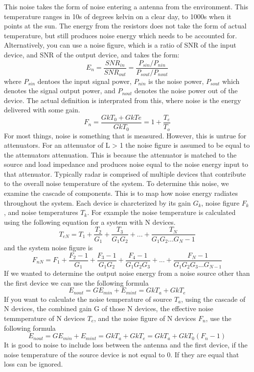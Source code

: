 \documentclass[12pt]{article}
\begin{document}
This noise takes the form of noise entering a antenna from the environment. This temperature ranges in 10s of degrees kelvin on a clear day, to 1000s when it points at the sun. The energy from the resistors does not take the form of actual temperature, but still produces noise energy which needs to be accounted for. Alternatively, you can use a noise figure, which is a ratio of SNR of the input device, and SNR of the output device, and takes the form:
\begin{equation}
    E_n = \frac{SNR_{in}}{SNR_{out}} = \frac{P_{sin} / P_{nin}}{P_{sout}/ P_{nout}}
\end{equation}
where $P_{sin}$ dentoes the input signal power, $P_{nin}$ is the noise power, $P_{sout}$ which denotes the signal output power, and $P_{nout}$ denotes the noise power out of the device. The actual definition is interprated from this, where noise is the energy delivered with some gain.
\begin{equation}
    F_n = \frac{GkT_0 + GkTe}{GkT_0} = 1 + \frac{T_e}{T_o}
\end{equation}
For most things, noise is something that is measured. However, this is untrue for attenuators. For an attenuator of L > 1 the noise figure is assumed to be equal to the attenuators attenuation. This is because the attenuator is matched to the source and load impedance and produces noise equal to the noise energy input to that attenuator. 
Typically radar is comprised of multiple devices that contribute to the overall noise temperature of the system. To determine this noise, we examine the cascade of components. This is to map how noise energy radiates throughout the system. Each device is charcterized by its gain $G_k$, noise figure $F_k$, and noise temperatures $T_k$.
For example the noise temperature is calculated using the following equation for a system with N devices.
\begin{equation}
    T_{eN} = T_1 + \frac{T_2}{G_1} + \frac{T_3}{G_1 G_2} +  ... + \frac{T_N}{G_1 G_2 ... G_N-1}
\end{equation}
and the system noise figure is 
\begin{equation}
    F_{nN} = F_1 + \frac{F_2 -1}{G_1} + \frac{F_3 -1}{G_1 G_2} + \frac{F_4 -1}{G_1 G_2 G_3} +  ... + \frac{F_N -1}{G_1 G_2 G_3 ... G_{N-1}}
\end{equation}
If we wanted to determine the output noise energy from a noise source other than the first device we can use the following formula
\begin{equation}
    E_{nout} = GE_{min} + E_{mint} = GkT_a + GkT_e
\end{equation}
If you want to calculate the noise temperature of source $T_a$, using the cascade of N devices, the combined gain G of those N devices, the effective noise temmperature of N devices $T_e$, and the noise figure of N devices $F_n$, use the following formula
\begin{equation}
    E_{nout} = GE_{min} + E_{mint} = GkT_a + GkT_e = GkT_a + GkT_0 (F_n -1)
\end{equation}
It is good to noise to include loss between the antenna and the first device, if the noise temperature of the source device is not equal to 0. If they are equal that loss can be ignored. 
\end{document}
